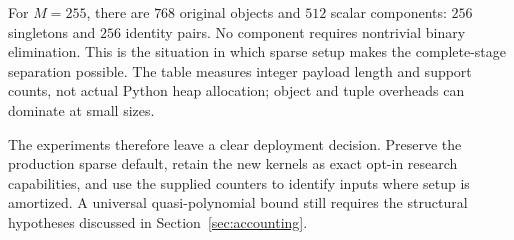 For \(M=255\), there are \(768\) original objects and \(512\)
scalar components: \(256\) singletons and \(256\) identity pairs.
No component requires nontrivial binary elimination. This is the
situation in which sparse setup makes the complete-stage separation
possible. The table measures integer payload length and support
counts, not actual Python heap allocation; object and tuple
overheads can dominate at small sizes.

The experiments therefore leave a clear deployment decision.
Preserve the production sparse default, retain the new kernels as
exact opt-in research capabilities, and use the supplied counters
to identify inputs where setup is amortized. A universal
quasi-polynomial bound still requires the structural hypotheses
discussed in Section~\ref{sec:accounting}.
